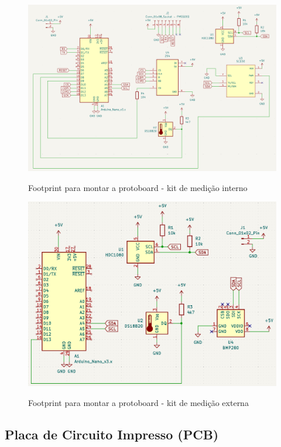 \documentclass[acronym,symbols]{fei}
\begin{document}
\begin{figure}[!htb]
\centering
    \caption{Footprint para montar a protoboard - kit de medição interno}
    \includegraphics[width=1\linewidth]{Imagens/Footprint protoboard interna.png}
    \label{fig:footprintprotoboardint}
\end{figure}

\begin{figure}[!htb]
\centering
    \caption{Footprint para montar a protoboard - kit de medição externa}
    \includegraphics[width=1\linewidth]{Imagens/Footprint protoboard Externo.png}
    \label{fig:footprintprotoboardext}
\end{figure}

\subsection{Placa de Circuito Impresso (PCB) } \label{PCB}
\end{document}
